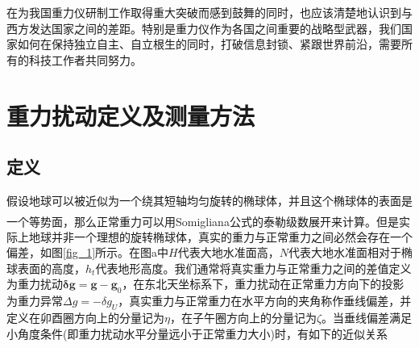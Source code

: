 \documentclass[12pt,a4,utf8]{article}
\newcommand{\upcite}[1]{\textsuperscript{\textsuperscript{\cite{#1}}}} %
\begin{document}
在为我国重力仪研制工作取得重大突破而感到鼓舞的同时，也应该清楚地认识到与西方发达国家之间的差距。特别是重力仪作为各国之间重要的战略型武器，我们国家如何在保持独立自主、自立根生的同时，打破信息封锁、紧跟世界前沿，需要所有的科技工作者共同努力。

\section{重力扰动定义及测量方法}
\subsection{定义}
假设地球可以被近似为一个绕其短轴均匀旋转的椭球体，并且这个椭球体的表面是一个等势面，那么正常重力可以用Somigliana公式的泰勒级数展开来计算\upcite{somigliana1929teoria}。但是实际上地球并非一个理想的旋转椭球体，真实的重力与正常重力之间必然会存在一个偏差，如图\ref{fig_1}所示。在图a中$H$代表大地水准面高，$N$代表大地水准面相对于椭球表面的高度，$h_t$代表地形高度。我们通常将真实重力与正常重力之间的差值定义为重力扰动$\bm{\delta g} = \bm{g} - \bm{g}_0$，在东北天坐标系下，重力扰动在正常重力方向下的投影为重力异常$\Delta g = -\delta g_U $，真实重力与正常重力在水平方向的夹角称作垂线偏差，并定义在卯酉圈方向上的分量记为$\eta$，在子午圈方向上的分量记为$\zeta$。当垂线偏差满足小角度条件(即重力扰动水平分量远小于正常重力大小)时，有如下的近似关系
 
\end{document}
